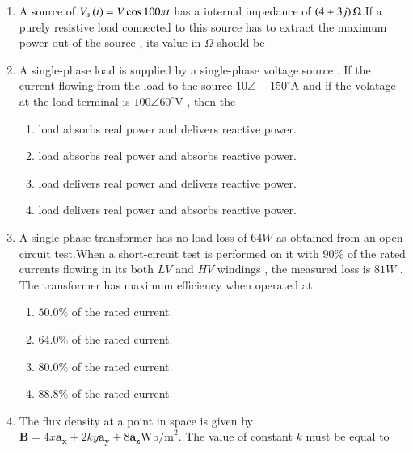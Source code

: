 \documentclass[journal]{IEEEtran}
\begin{document}
\begin{enumerate}
\begin{enumerate}
\end{enumerate}
\item A source of $V_s\left(t\right)=V\cos{100\pi t}$ has a internal impedance of $\left(4+3j\right)\Omega$.If a purely resistive load connected to this source has to extract the maximum power out of the source , its value in $\Omega$ should be 
\begin{enumerate}
\end{enumerate}
\item A single-phase load is supplied by a single-phase voltage source . If the current flowing from the load to the source $10\angle -150^\circ $A and if the volatage at the load terminal is  $100\angle 60^\circ$V , then the
\begin{enumerate}
\item load absorbs real power and delivers reactive power. 
\item load absorbs real power and absorbs reactive power.
\item load delivers real power and delivers reactive power.
\item load delivers real power and absorbs reactive power.
\end{enumerate}
\newpage
\item A single-phase transformer has no-load loss of $64W$ as obtained from an open-circuit test.When a short-circuit test is performed on it with $90\%$ of the rated currents flowing in its both $LV$ and $HV$ windings , the measured loss is $81W$ . The transformer  has maximum efficiency when operated at 
\begin{enumerate}
\item $ 50.0\% $ of the rated current.
\item $ 64.0\% $ of the rated current.
\item $ 80.0\% $ of the rated current.
\item $ 88.8\% $ of the rated current.
\end{enumerate}
\item The flux density at a point in space is given by $\mathbf{B} = 4x\mathbf{a_x} + 2k y\mathbf{a_y} + 8 \mathbf{a_z}\text{Wb/m}^2$. The value of constant $k$ must be equal to
\begin{enumerate}

\end{enumerate}
\end{enumerate}
\end{document}
